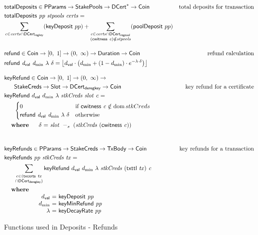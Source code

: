 \begin{figure}[htb]
  \begin{align*}
    & \fun{totalDeposits} \in \PParams \to \StakePools \to \seqof{\DCert} \to \Coin
    & \text{total deposits for transaction} \\
    & \totalDeposits{pp}{stpools}{certs} = \\
    &  \sum\limits_{c\in\var{certs} \cap \DCertRegKey}(\fun{keyDeposit}~pp)
    +  \sum\limits_{\substack{
         c\in\var{certs}\cap\DCertRegPool \\ (\cwitness{c})\notin \var{stpools}}}
         (\fun{poolDeposit}~pp)
      \nextdef
      & \fun{refund} \in \Coin \to \unitInterval \to \posReals \to \Duration \to \Coin
      & \text{refund calculation} \\
      & \refund{\dval}{d_{\min}}{\lambda}{\delta} =
            \floor*{
              \dval \cdot
            \left(d_{\min}+(1-d_{\min})\cdot e^{-\lambda\cdot\delta}\right)}
      \nextdef
      & \fun{keyRefund} \in \Coin \to \unitInterval \to \posReals \to \\
      & ~~~~~\StakeCreds \to \Slot \to \DCertDeRegKey \to \Coin
      & \text{key refund for a certificate} \\
      & \keyRefund{\dval}{d_{\min}}{\lambda}{stkCreds}{slot}{c} =\\
      & ~~~~~\begin{cases}
            0 & \text{if}~\cwitness c \notin \dom stkCreds \\
            \refund{\dval}{d_{\min}}{\lambda}{\delta}
            & \text{otherwise}
        \end{cases}\\
      &
      \begin{array}{lr@{~=~}l}
        \where
        &\delta & \slotminus{slot}{(stkCreds~(\cwitness c))}\\
      \end{array}\\
      \nextdef
      & \fun{keyRefunds} \in \PParams \to \StakeCreds \to \TxBody \to \Coin
      & \text{key refunds for a transaction} \\
      & \keyRefunds{pp}{stkCreds}{tx} =\\
      & ~~~~~ \sum\limits_{\substack{c \in (\txcerts{tx} \\ \cap \DCertDeRegKey)}}
              \keyRefund{\dval}{d_{\min}}{\lambda}{stkCreds}{(\txttl{tx})}{c}\\
      &
      \begin{array}{lr@{~=~}l}
        \where \\
        & \dval & \fun{keyDeposit}~\var{pp}\\
        & d_{\min} & \fun{keyMinRefund}~\var{pp}\\
        & \lambda & \fun{keyDecayRate}~\var{pp}\\
      \end{array}\\
  \end{align*}
  \caption{Functions used in Deposits - Refunds}
  \label{fig:functions:deposits-refunds}
\end{figure}

